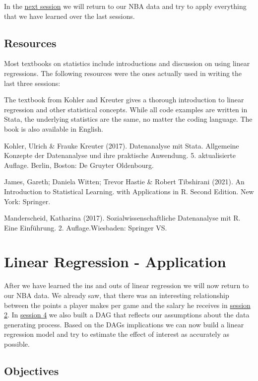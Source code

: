 \documentclass[
]{book}
\begin{document}
In the \protect\hyperlink{lin-a}{next session} we will return to our NBA data and try to apply everything that we have learned over the last sessions.

\hypertarget{resources-1}{%
\section{Resources}\label{resources-1}}

Most textbooks on statistics include introductions and discussion on using linear regressions. The following resources were the ones actually used in writing the last three sessions:

The textbook from Kohler and Kreuter gives a thorough introduction to linear regression and other statistical concepts. While all code examples are written in Stata, the underlying statistics are the same, no matter the coding language. The book is also available in English.

Kohler, Ulrich \& Frauke Kreuter (2017). Datenanalyse mit Stata. Allgemeine Konzepte der Datenanalyse und ihre praktische Anwendung. 5. aktualisierte Auflage. Berlin, Boston: De Gruyter Oldenbourg.

\hfill\break

James, Gareth; Daniela Witten; Trevor Hastie \& Robert Tibshirani (2021). An Introduction to Statistical Learning. with Applications in R. Second Edition. New York: Springer.

\hfill\break

Manderscheid, Katharina (2017). Sozialwissenschaftliche Datenanalyse mit R. Eine Einführung. 2. Auflage.Wiesbaden: Springer VS.

\hypertarget{lin-a}{%
\chapter{Linear Regression - Application}\label{lin-a}}

After we have learned the ins and outs of linear regression we will now
return to our NBA data. We already saw, that there was an interesting
relationship between the points a player makes per game and the salary
he receives in \protect\hyperlink{eda-1}{session 2}. In \protect\hyperlink{dags-1}{session 4} we also
built a DAG that reflects our assumptions about the data generating
process. Based on the DAGs implications we can now build a linear
regression model and try to estimate the effect of interest as
accurately as possible.

\hypertarget{objectives-5}{%
\section{Objectives}\label{objectives-5}}
\end{document}
